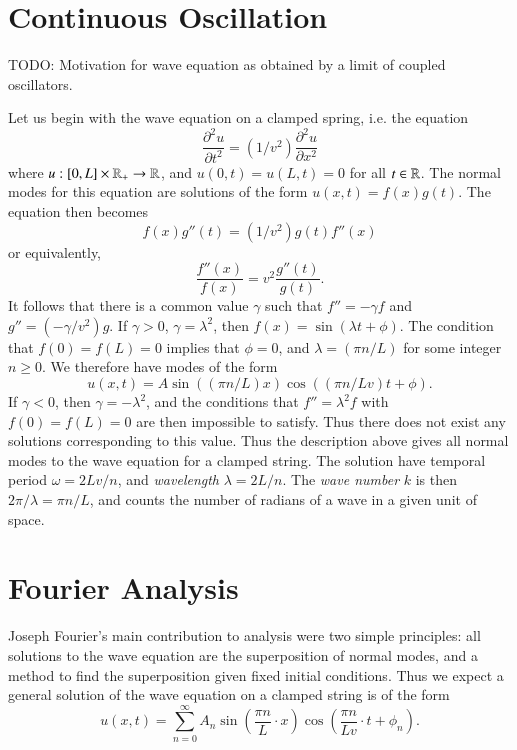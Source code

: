 \section{Continuous Oscillation}

TODO: Motivation for wave equation as obtained by a limit of coupled oscillators.

Let us begin with the wave equation on a clamped spring, i.e. the equation
%
\[ \frac{\partial^2 u}{\partial t^2} = (1/v^2) \frac{\partial^2 u}{\partial x^2} \]
%
where $u: [0,L] \times \operatorname{\mathbb{R}}_+ \to \operatorname{\mathbb{R}}$, and $u(0,t) = u(L,t) = 0$ for all $t \in \operatorname{\mathbb{R}}$. The normal modes for this equation are solutions of the form $u(x,t) = f(x) g(t)$. The equation then becomes
%
\[ f(x) g''(t) = (1/v^2) g(t) f''(x) \]
%
or equivalently,
%
\[ \frac{f''(x)}{f(x)} = v^2 \frac{g''(t)}{g(t)}. \]
%
It follows that there is a common value $\gamma$ such that $f'' = -\gamma f$ and $g'' = (-\gamma / v^2) g$. If $\gamma > 0$, $\gamma = \lambda^2$, then $f(x) = \sin (\lambda t + \phi)$. The condition that $f(0) = f(L) = 0$ implies that $\phi = 0$, and $\lambda = (\pi n / L)$ for some integer $n \geq 0$. We therefore have modes of the form
%
\[ u(x,t) = A \sin( (\pi n / L) x ) \cos( (\pi n / L v) t + \phi ). \]
%
If $\gamma < 0$, then $\gamma = -\lambda^2$, and the conditions that $f'' = \lambda^2 f$ with $f(0) = f(L) = 0$ are then impossible to satisfy. Thus there does not exist any solutions corresponding to this value. Thus the description above gives all normal modes to the wave equation for a clamped string. The solution have temporal period $\omega = 2Lv/n$, and \emph{wavelength} $\lambda = 2 L / n$. The \emph{wave number} $k$ is then $2\pi / \lambda = \pi n / L$, and counts the number of radians of a wave in a given unit of space.

\section{Fourier Analysis}

Joseph Fourier's main contribution to analysis were two simple principles: all solutions to the wave equation are the superposition of normal modes, and a method to find the superposition given fixed initial conditions. Thus we expect a general solution of the wave equation on a clamped string is of the form
%
\[ u(x,t) = \sum_{n = 0}^\infty A_n \sin \left( \frac{\pi n}{L} \cdot x \right) \cos \left( \frac{\pi n}{L v} \cdot t + \phi_n \right). \]





